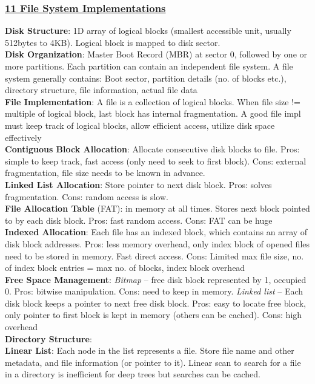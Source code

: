 \documentclass{article}
\begin{document}
{\begin{multicols*}{3}
\subsubsection*{\underline{11 File System Implementations}}
\textbf{Disk Structure}: 1D array of logical blocks (smallest accessible unit, usually 512bytes to 4KB). Logical block is mapped to disk sector.\\
\textbf{Disk Organization}: Master Boot Record (MBR) at sector 0, followed by one or more partitions. Each partition can contain an independent file system. A file system generally contains: Boot sector, partition details (no. of blocks etc.), directory structure, file information, actual file data\\
\textbf{File Implementation}: A file is a collection of logical blocks. When file size != multiple of logical block, last block has internal fragmentation. A good file impl must keep track of logical blocks, allow efficient access, utilize disk space effectively\\ 
\textbf{Contiguous Block Allocation}: Allocate consecutive disk blocks to file. Pros: simple to keep track, fast access (only need to seek to first block). Cons: external fragmentation, file size needs to be known in advance.\\
\textbf{Linked List Allocation}: Store pointer to next disk block. Pros: solves fragmentation. Cons: random access is slow. \\
\textbf{File Allocation Table} (FAT): in memory at all times. Stores next block pointed to by each disk block. Pros: fast random access. Cons: FAT can be huge \\
\textbf{Indexed Allocation}: Each file has an indexed block, which contains an array of disk block addresses. Pros: less memory overhead, only index block of opened files need to be stored in memory. Fast direct access. Cons: Limited max file size, no. of index block entries = max no. of blocks, index block overhead\\
\textbf{Free Space Management}: \textit{Bitmap} – free disk block represented by 1, occupied 0. Pros: bitwise manipulation. Cons: need to keep in memory. \textit{Linked list} – Each disk block keeps a pointer to next free disk block. Pros: easy to locate free block, only pointer to first block is kept in memory (others can be cached). Cons: high overhead \\
\textbf{Directory Structure}: \\
\textbf{Linear List}: Each node in the list represents a file. Store file name and other metadata, and file information (or pointer to it). Linear scan to search for a file in a directory is inefficient for deep trees but searches can be cached. \\

\end{multicols*}}
\end{document}
